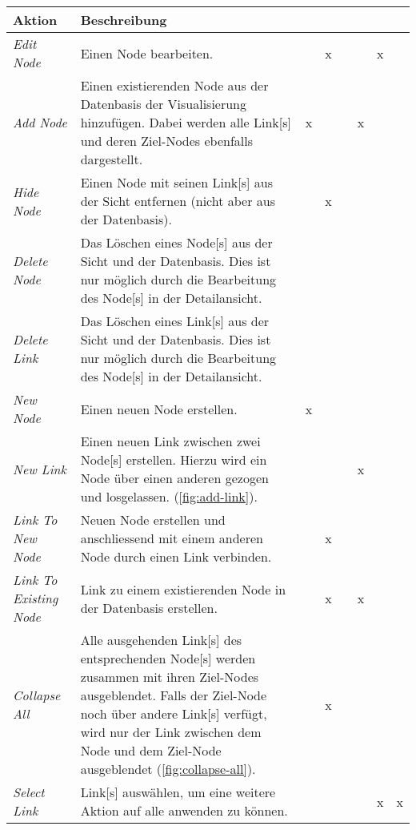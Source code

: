     \begin{longtable}{|P{2cm}|P{5cm}||p{0.3cm}|p{0.3cm}|p{0.3cm}|p{0.3cm}|p{0.3cm}|p{0.3cm}|}
  \hline
    Aktion & Beschreibung & & & & & & \\\hline
    \textit{Edit Node} & Einen \gls{Node} bearbeiten. &&x&&&x& \\\hline
    \textit{Add Node} & Einen existierenden \gls{Node} aus der Datenbasis der Visualisierung hinzufügen. Dabei werden alle \gls{Link}[s] und deren Ziel-Nodes ebenfalls dargestellt. &x&&&x&& \\\hline
    \textit{Hide Node} & Einen \gls{Node} mit seinen \gls{Link}[s] aus der Sicht entfernen (nicht aber aus der Datenbasis). &&x&&&& \\\hline
    \textit{Delete Node} & Das Löschen eines \gls{Node}[s] aus der Sicht und der Datenbasis. Dies ist nur möglich durch die Bearbeitung des \gls{Node}[s] in der Detailansicht. &&&&&& \\\hline
    \textit{Delete Link} & Das Löschen eines \gls{Link}[s] aus der Sicht und der Datenbasis. Dies ist nur möglich durch die Bearbeitung des \gls{Node}[s] in der Detailansicht. &&&&&& \\\hline
    \textit{New Node} &  Einen neuen \gls{Node} erstellen. &x&&&&& \\\hline
    \textit{New Link} & Einen neuen \gls{Link} zwischen zwei \gls{Node}[s] erstellen. Hierzu wird ein \gls{Node} über einen anderen gezogen und losgelassen. (\autoref{fig:add-link}). &&&&x&& \\\hline
    \textit{Link To New Node} & Neuen \gls{Node} erstellen und anschliessend mit einem anderen \gls{Node} durch einen \gls{Link} verbinden. &&x&&&& \\\hline
    \textit{Link To Existing Node} & \gls{Link} zu einem existierenden \gls{Node} in der Datenbasis erstellen. &&x&&x&& \\\hline
    \textit{Collapse All} & Alle ausgehenden \gls{Link}[s] des entsprechenden \gls{Node}[s] werden zusammen mit ihren Ziel-Nodes ausgeblendet. Falls der Ziel-Node noch über andere \gls{Link}[s] verfügt, wird nur der \gls{Link} zwischen dem \gls{Node} und dem Ziel-Node ausgeblendet (\autoref{fig:collapse-all}). &&x&&&& \\\hline
    \textit{Select Link} & \gls{Link}[s] auswählen, um eine weitere Aktion auf alle anwenden zu können. &&&&&x&x \\\hline

\end{longtable}
